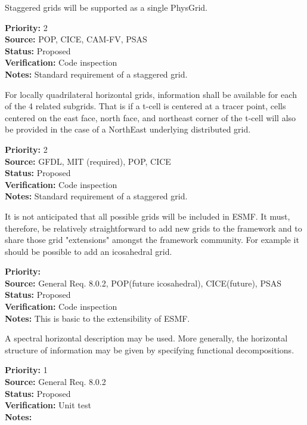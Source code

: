 Staggered grids will be supported as a single PhysGrid.
\begin{reqlist}
{\bf Priority:} 2 \\
{\bf Source:} POP, CICE, 
CAM-FV, PSAS  \\
{\bf Status:} Proposed \\
{\bf Verification:} Code inspection\\
{\bf Notes:} Standard requirement of a staggered grid.
\end{reqlist}

For locally quadrilateral horizontal grids, information shall be available for
each of the 4 related subgrids.  That is if a t-cell is centered at a tracer
point,  cells centered on the east face, north face, and northeast corner of
the t-cell will also be provided in the case of a NorthEast underlying
distributed grid.
\begin{reqlist}
{\bf Priority:} 2 \\
{\bf Source:} GFDL, MIT (required), POP, CICE \\
{\bf Status:} Proposed \\
{\bf Verification:} Code inspection\\
{\bf Notes:} Standard requirement of a staggered grid.
\end{reqlist}

It is not anticipated that all possible grids will be included in
ESMF. It must, therefore, be relatively straightforward to add
new grids to the framework and to share those grid "extensions"
amongst the framework community. For example it should be possible
to add an icosahedral grid.
\begin{reqlist}
{\bf Priority:} \\
{\bf Source:} General Req. 8.0.2, POP(future icosahedral), CICE(future), 
PSAS  \\
{\bf Status:} Proposed \\
{\bf Verification:} Code inspection \\
{\bf Notes:} This is basic to the extensibility of ESMF.
\end{reqlist}


A spectral horizontal description may be used.  More generally, the horizontal
structure of information may be given by specifying functional decompositions.
\begin{reqlist}
{\bf Priority:} 1 \\
{\bf Source:} General Req. 8.0.2  \\
{\bf Status:} Proposed \\
{\bf Verification:} Unit test\\
{\bf Notes:}
\end{reqlist}

